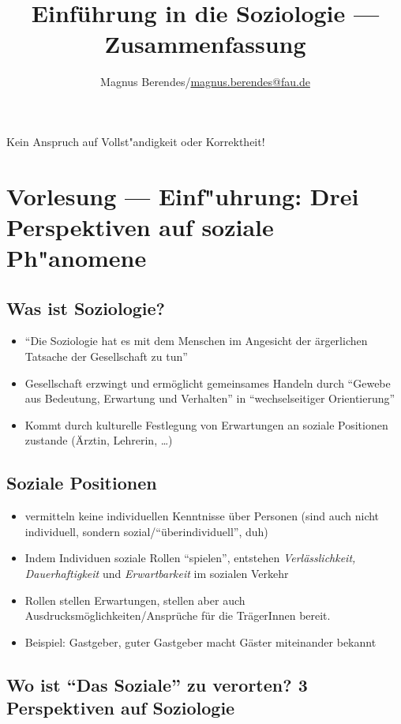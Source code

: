 \documentclass[a4paper, 12pt]{scrartcl}
\newcommand{\Romann}[1]{\uppercase\expandafter{\romannumeral#1}}
\begin{document}
\title{Einführung in die Soziologie --- Zusammenfassung}
\author{Magnus Berendes/\href{mailto:magnus.berendes@fau.de}{magnus.berendes@fau.de}}
\maketitle

{ Kein Anspruch auf Vollst"andigkeit oder Korrektheit!}

\tableofcontents
\newpage
\printindex
\newpage
\section{Vorlesung \Romann{2} --- Einf"uhrung: Drei Perspektiven auf soziale Ph"anomene}
\subsection{Was ist Soziologie?}
\begin{itemize}
	\item
\enquote{Die Soziologie hat es mit dem Menschen im Angesicht der ärgerlichen Tatsache der Gesellschaft zu tun}
\item
	Gesellschaft erzwingt und ermöglicht gemeinsames Handeln durch \enquote{Gewebe aus Bedeutung, Erwartung und Verhalten} in \enquote{wechselseitiger Orientierung}
\item
	Kommt durch kulturelle Festlegung von Erwartungen an soziale Positionen zustande (Ärztin, Lehrerin, \dots)
\end{itemize}
\subsection{Soziale Positionen}
\begin{itemize}
	\item
		vermitteln keine individuellen Kenntnisse über Personen (sind auch nicht individuell, sondern sozial/\enquote{überindividuell}, duh)
	\item
		Indem Individuen soziale Rollen \enquote{spielen}, entstehen \textit{Verlässlichkeit, Dauerhaftigkeit} und \textit{Erwartbarkeit} im sozialen Verkehr
	\item
		Rollen stellen Erwartungen, stellen aber auch Ausdrucksmöglichkeiten/Ansprüche für die TrägerInnen bereit.
	\item
		Beispiel: Gastgeber, guter Gastgeber macht Gäster miteinander bekannt
\end{itemize}

\subsection{Wo ist \enquote{Das Soziale} zu verorten? 3 Perspektiven auf Soziologie}
\end{document}
